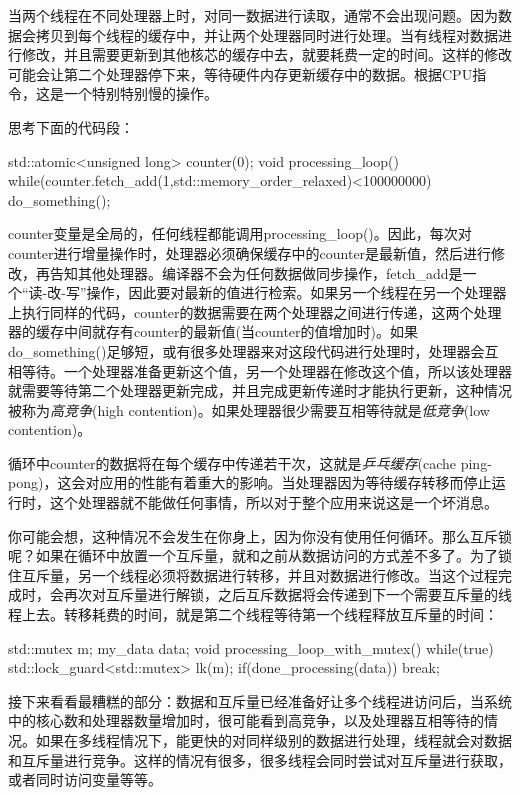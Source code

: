 
当两个线程在不同处理器上时，对同一数据进行读取，通常不会出现问题。因为数据会拷贝到每个线程的缓存中，并让两个处理器同时进行处理。当有线程对数据进行修改，并且需要更新到其他核芯的缓存中去，就要耗费一定的时间。这样的修改可能会让第二个处理器停下来，等待硬件内存更新缓存中的数据。根据CPU指令，这是一个特别特别慢的操作。

思考下面的代码段：

\begin{cpp}
std::atomic<unsigned long> counter(0);
void processing_loop()
{
  while(counter.fetch_add(1,std::memory_order_relaxed)<100000000)
  {
    do_something();
  }
}
\end{cpp}

counter变量是全局的，任何线程都能调用processing\_loop()。因此，每次对counter进行增量操作时，处理器必须确保缓存中的counter是最新值，然后进行修改，再告知其他处理器。编译器不会为任何数据做同步操作，fetch\_add是一个“读-改-写”操作，因此要对最新的值进行检索。如果另一个线程在另一个处理器上执行同样的代码，counter的数据需要在两个处理器之间进行传递，这两个处理器的缓存中间就存有counter的最新值(当counter的值增加时)。如果do\_something()足够短，或有很多处理器来对这段代码进行处理时，处理器会互相等待。一个处理器准备更新这个值，另一个处理器在修改这个值，所以该处理器就需要等待第二个处理器更新完成，并且完成更新传递时才能执行更新，这种情况被称为\textit{高竞争}(high contention)。如果处理器很少需要互相等待就是\textit{低竞争}(low contention)。

循环中counter的数据将在每个缓存中传递若干次，这就是\textit{乒乓缓存}(cache ping-pong)，这会对应用的性能有着重大的影响。当处理器因为等待缓存转移而停止运行时，这个处理器就不能做任何事情，所以对于整个应用来说这是一个坏消息。

你可能会想，这种情况不会发生在你身上，因为你没有使用任何循环。那么互斥锁呢？如果在循环中放置一个互斥量，就和之前从数据访问的方式差不多了。为了锁住互斥量，另一个线程必须将数据进行转移，并且对数据进行修改。当这个过程完成时，会再次对互斥量进行解锁，之后互斥数据将会传递到下一个需要互斥量的线程上去。转移耗费的时间，就是第二个线程等待第一个线程释放互斥量的时间：

\begin{cpp}
std::mutex m;
my_data data;
void processing_loop_with_mutex()
{
  while(true)
  {
    std::lock_guard<std::mutex> lk(m);
    if(done_processing(data)) break;
  }
}
\end{cpp}

接下来看看最糟糕的部分：数据和互斥量已经准备好让多个线程进访问后，当系统中的核心数和处理器数量增加时，很可能看到高竞争，以及处理器互相等待的情况。如果在多线程情况下，能更快的对同样级别的数据进行处理，线程就会对数据和互斥量进行竞争。这样的情况有很多，很多线程会同时尝试对互斥量进行获取，或者同时访问变量等等。

